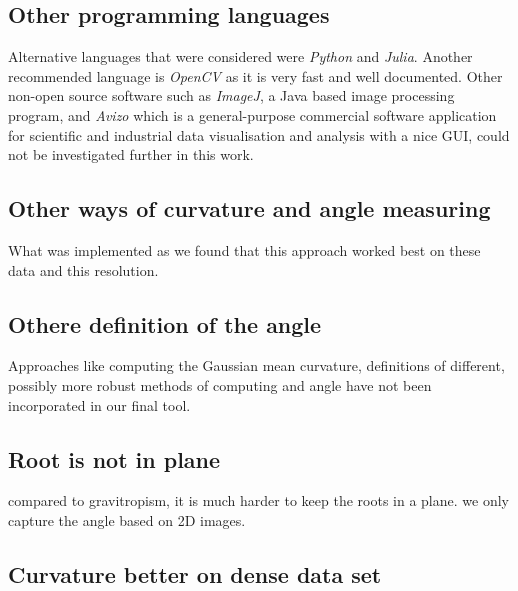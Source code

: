 \subsection{Other programming languages}

Alternative languages that were considered were \textit{Python} and \textit{Julia}. Another recommended language is \textit{OpenCV} as it is very fast and well documented. Other non-open source software such as \textit{ImageJ}, a Java based image processing program, and \textit{Avizo} which is a general-purpose commercial software application for scientific and industrial data visualisation and analysis with a nice GUI, could not be investigated further in this work. 


\subsection{Other ways of curvature and angle measuring}

What was implemented as we found that this approach worked best on these data and this resolution.

\subsection{Othere definition of the angle}
Approaches like computing the Gaussian mean curvature, definitions of different, possibly more robust methods of computing and angle %
have not been incorporated in our final tool. 


\subsection{Root is not in plane}

compared to gravitropism, it is much harder to keep the roots in a plane. we only capture the angle based on 2D images.

\subsection{Curvature better on dense data set}



